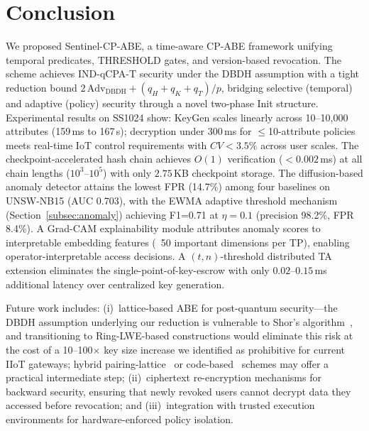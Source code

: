 \documentclass[lettersize,journal]{IEEEtran}
\begin{document}
\section{Conclusion}
\label{sec:conclusion}


We proposed Sentinel-CP-ABE, a time-aware CP-ABE framework unifying
temporal predicates, THRESHOLD gates, and version-based revocation.
The scheme achieves IND-qCPA-T security under the DBDH assumption with
a tight reduction bound $2\,\text{Adv}_{\text{DBDH}} + (q_H+q_K+q_T)/p$,
bridging selective (temporal) and adaptive (policy) security through a
novel two-phase Init structure. Experimental results on SS1024 show:
KeyGen scales linearly across 10--10,000 attributes (159\,ms to 167\,s);
decryption under 300\,ms for $\leq$10-attribute policies meets real-time
IoT control requirements with $CV < 3.5\%$ across user scales.
The checkpoint-accelerated hash chain achieves $O(1)$ verification
($<0.002$\,ms) at all chain lengths ($10^3$--$10^5$) with only
$2.75$\,KB checkpoint storage. The diffusion-based anomaly detector attains the
lowest FPR (14.7\%) among four baselines on UNSW-NB15 (AUC 0.703),
with the EWMA adaptive threshold mechanism (Section~\ref{subsec:anomaly})
achieving F1=0.71 at $\eta=0.1$ (precision 98.2\%, FPR 8.4\%). A Grad-CAM explainability module attributes
anomaly scores to interpretable embedding features (~50 important dimensions per TP),
enabling operator-interpretable access decisions. A $(t,n)$-threshold
distributed TA extension eliminates the single-point-of-key-escrow with
only $0.02$--$0.15$\,ms additional latency over centralized key generation.

Future work includes: (i)~lattice-based ABE for post-quantum security---the
DBDH assumption underlying our reduction is vulnerable to Shor's algorithm~\cite{Shor1997},
and transitioning to Ring-LWE-based constructions would eliminate this
risk at the cost of a 10--100$\times$ key size increase we identified
as prohibitive for current IIoT gateways; hybrid
pairing-lattice~\cite{Gasparini2026_LatticeBenchmark} or
code-based~\cite{Poomekum2025_Lattice} schemes may offer a practical
intermediate step; (ii)~ciphertext
re-encryption mechanisms for backward security, ensuring that newly
revoked users cannot decrypt data they accessed before revocation;
and (iii)~integration with trusted execution environments for
hardware-enforced policy isolation.



\end{document}
